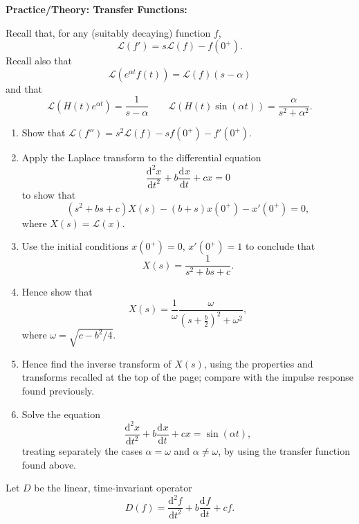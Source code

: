 \documentclass{article}
\newcommand{\deriv}[3][]{\frac{\mathrm{d}^{#1}#2}{\mathrm{d}#3^{#1}}}
\begin{document}
\textbf{Practice/Theory: Transfer Functions:}\bigskip


Recall that, for any (suitably decaying) function $f$,
\[\mathcal{L}\left(f'\right) = s\mathcal{L}(f)-f(0^+).\]
Recall also that
\[\mathcal{L}\left(e^{\alpha t}f(t)\right)=\mathcal{L}(f)(s-\alpha)\]
and that
\[\mathcal{L}\left(H(t)e^{\alpha t}\right)=\frac{1}{s-\alpha}\qquad \mathcal{L}(H(t)\sin(\alpha t))=\frac{\alpha}{s^2+\alpha^2}.\]

\begin{enumerate}
	\item Show that $\mathcal{L}(f'')=s^2\mathcal{L}(f) - sf(0^+)- f'(0^+)$.
	\item Apply the Laplace transform to the differential equation
		\[\deriv[2]{x}{t}+b\deriv{x}{t}+cx = 0\]
		to show that
		\[(s^2+bs+c)X(s) - (b+s)x(0^+) - x'(0^+)=0,\]
		where $X(s)=\mathcal{L}(x)$.
	\item Use the initial conditions $x(0^+)=0$, $x'(0^+)=1$ to conclude that
		\[X(s)=\frac{1}{s^2+bs+c}.\]
	\item Hence show that
		\[X(s)=\frac{1}{\omega}\frac{\omega}{\left(s+\frac{b}{2}\right)^2+\omega^2},\]
		where $\omega=\sqrt{c-b^2/4}$.
	\item Hence find the inverse transform of $X(s)$, using the properties and transforms recalled at the top of the page; compare with the impulse response found previously.
	\item Solve the equation
		\[\deriv[2]{x}{t}+b\deriv{x}{t}+cx=\sin(\alpha t),\]
		treating separately the cases $\alpha=\omega$ and $\alpha\neq \omega$, by using the transfer function found above.
\end{enumerate}



\iffalse

Let $D$ be the linear, time-invariant operator
\[D(f)=\deriv[2]{f}{t}+b\deriv{f}{t}+cf.\]
\end{document}
